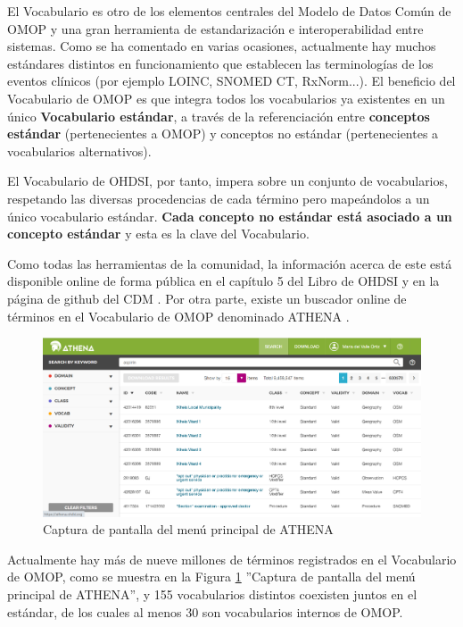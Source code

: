 El Vocabulario es otro de los elementos centrales del Modelo de Datos Común de OMOP y una gran herramienta de estandarización e interoperabilidad entre sistemas. Como se ha comentado en varias ocasiones, actualmente hay muchos estándares distintos en funcionamiento que establecen las terminologías de los eventos clínicos (por ejemplo LOINC, SNOMED CT, RxNorm...). El beneficio del Vocabulario de OMOP es que integra todos los vocabularios ya existentes en un único \textbf{Vocabulario estándar}, a través de la referenciación entre \textbf{conceptos estándar} (pertenecientes a OMOP) y conceptos no estándar (pertenecientes a vocabularios alternativos).

El Vocabulario de OHDSI, por tanto, impera sobre un conjunto de vocabularios, respetando las diversas procedencias de cada término pero mapeándolos a un único vocabulario estándar. \textbf{Cada concepto no estándar está asociado a un concepto estándar} y esta es la clave del Vocabulario. 

Como todas las herramientas de la comunidad, la información acerca de este está disponible online de forma pública en el capítulo 5 del Libro de OHDSI \parencite{OHDSIbook} y en la página de github del CDM \parencite{gitPagesCMD}. Por otra parte, existe un buscador online de términos en el Vocabulario de OMOP denominado ATHENA \parencite{ATHENAweb}. 

\begin{figure}[H]
\centering
\includegraphics[width=1\textwidth]{figures/ATHENAcap.png}
     \caption{Captura de pantalla del menú principal de ATHENA}
    \label{fig:ATHENAcap}
\end{figure}

Actualmente hay más de nueve millones de términos registrados en el Vocabulario de OMOP, como se muestra en la Figura \ref{fig:ATHENAcap} ''Captura de pantalla del menú principal de ATHENA'', y 155 vocabularios distintos coexisten juntos en el estándar, de los cuales al menos 30 son vocabularios internos de OMOP.

